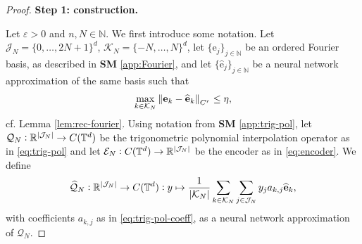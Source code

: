 \documentclass{article}
\numberwithin{equation}{section}
\newcommand{\fb}{\bm{\mathrm{e}}}
\newcommand{\T}{\mathbb{T}}
\newcommand{\R}{\mathbb{R}}
\newcommand{\N}{\mathbb{N}}
\newcommand{\cE}{\mathcal{E}}
\newcommand{\cJ}{\mathcal{J}}
\newcommand{\cK}{\mathcal{K}}
\newcommand{\cQ}{\mathcal{Q}}
\renewcommand{\epsilon}{\varepsilon}
\newcommand{\1}{\mathbbm{1}}
\newcommand{\cQhat}{{\widehat{\cQ}}}
\begin{document}
\begin{proof}


\textbf{Step 1: construction. }

Let $\epsilon>0$ and $n,N\in\N$. We first introduce some notation. Let $\cJ_N = \{0,\ldots, 2N+1\}^d$, $\cK_N = \{-N, \ldots, N\}^d$, let $\{\fb_j\}_{j\in\N}$ be an ordered Fourier basis, as described in \textbf{SM} \ref{app:Fourier}, and let $\{\widehat{\fb}_j\}_{j\in\N}$ be a neural network approximation of the same basis such that
\begin{equation}\label{eq:fb-nn}
    \max_{k\in\cK_N}\norm{\fb_k-\widehat{\fb}_k}_{C^r} \leq \eta, 
\end{equation}
cf. Lemma \ref{lem:rec-fourier}. Using notation from \textbf{SM} \ref{app:trig-pol}, let $\cQ_N:\R^{\abs{\cJ_N}}\to C(\T^d)$ be the trigonometric polynomial interpolation operator as in \eqref{eq:trig-pol} and let $\cE_N:C(\T^d)\to\R^{\abs{\cJ_N}}$ be the encoder as in \eqref{eq:encoder}. We define
\begin{equation}\label{eq:qhat}
    \cQhat_{N}:\R^{\abs{\cJ_N}}\to C(\T^d): y \mapsto \frac{1}{\abs{\cK_N}} \sum_{k\in \cK_N} \sum_{j\in \cJ_N} y_j a_{k,j} \widehat{\fb}_k, 
\end{equation}
with coefficients $a_{k,j}$ as in \eqref{eq:trig-pol-coeff}, as a neural network approximation of $\cQ_N$. 


\end{proof}
\end{document}
